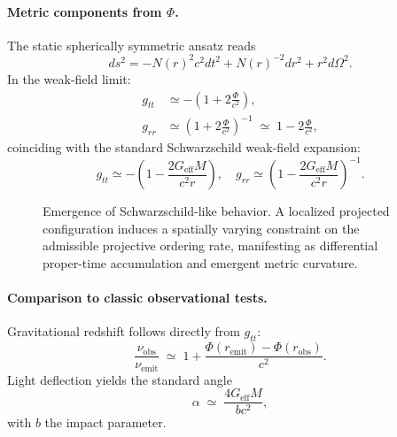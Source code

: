  \paragraph{Metric components from \texorpdfstring{$\Phi$}{Φ}.}
    The static spherically symmetric ansatz reads
    \begin{equation}
      ds^2 = -N(r)^2 c^2 dt^2 + N(r)^{-2} dr^2
      + r^2 d\Omega^2.
      \label{eq:metric_from_N}
    \end{equation}
    In the weak-field limit:
    \begin{align}
      g_{tt} &\simeq
      -\left(1 + 2\frac{\Phi}{c^2}\right),
      \label{eq:weak_gtt}\\
      g_{rr} &\simeq
      \left(1 + 2\frac{\Phi}{c^2}\right)^{-1}
      \;\simeq\; 1 - 2\frac{\Phi}{c^2},
      \label{eq:weak_grr}
    \end{align}
    coinciding with the standard Schwarzschild weak-field expansion:
    \begin{equation}
      g_{tt} \simeq
      -\left(1-\frac{2G_{\mathrm{eff}}M}{c^2 r}\right),
      \quad
      g_{rr} \simeq
      \left(1-\frac{2G_{\mathrm{eff}}M}{c^2 r}\right)^{-1}.
      \label{eq:schwarzschild_matching}
    \end{equation}

    \begin{figure}[htbp]
      \centering
      \caption{Emergence of Schwarzschild-like behavior.
      A localized projected configuration induces a spatially varying
      constraint on the admissible projective ordering rate, manifesting as
      differential proper-time accumulation and emergent metric curvature.}
      \label{fig:chi_gravity}
    \end{figure}

  \paragraph{Comparison to classic observational tests.}
    Gravitational redshift follows directly from $g_{tt}$:
    \begin{equation}
      \frac{\nu_{\mathrm{obs}}}{\nu_{\mathrm{emit}}}
      \;\simeq\;
      1 + \frac{\Phi(r_{\mathrm{emit}})
      -\Phi(r_{\mathrm{obs}})}{c^2}.
    \end{equation}
    Light deflection yields the standard angle
    \begin{equation}
      \alpha \;\simeq\;
      \frac{4G_{\mathrm{eff}}M}{b c^2},
    \end{equation}
    with $b$ the impact parameter.
